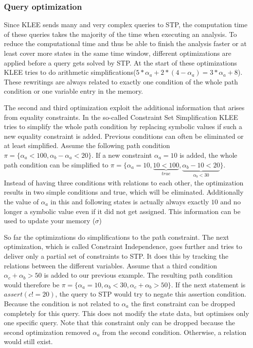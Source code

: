 \subsubsection{Query optimization}
Since KLEE sends many and very complex queries to STP, the computation time of these queries takes the majority of the time when executing an analysis. To reduce the computational time and thus be able to finish the analysis faster or at least cover more states in the same time window, different optimizations are applied before a query gets solved by STP. 
At the start of these optimizations KLEE tries to do arithmetic simplifications($5*\alpha_a + 2*(4-\alpha_a) = 3 * \alpha_a + 8$). These rewritings are always related to exactly one condition of the whole path condition or one variable entry in the memory.

The second and third optimization exploit the additional information that arises from equality constraints. In the so-called Constraint Set Simplification KLEE tries to simplify the whole path condition by replacing symbolic values if such a new equality constraint is added. Previous conditions can often be eliminated or at least simplified. 
Assume the following path condition $\pi = \{\alpha_a < 100, \alpha_b - \alpha_a< 20\}$. If a new constraint $\alpha_a = 10$ is added, the whole path condition can be simplified to $\pi = \{\alpha_a = 10, \underbrace{10 < 100}_{true},\underbrace{\alpha_b - 10 < 20}_{\alpha_b < 30}\}$. Instead of having three conditions with relations to each other, the optimization results in two simple conditions and true, which will be eliminated. Additionally the value of $\alpha_a$ in this and following states is actually always exactly $10$ and no longer a symbolic value even if it did not get assigned. This information can be used to update your memory ($\sigma$)

So far the optimizations do simplifications to the path constraint. The next optimization, which is called Constraint Independence, goes further and tries to deliver only a partial set of constraints to STP. It does this by tracking the relations between the different variables. Assume that a third condition $\alpha_c + \alpha_b > 50$ is added to our previous example. The resulting path condition would therefore be $\pi = \{\alpha_a = 10, \alpha_b < 30, \alpha_c + \alpha_b > 50\}$. If the next statement is $assert(c != 20)$, the query to STP would try to negate this assertion condition. Because the condition is not related to $\alpha_a$ the first constraint can be dropped completely for this query. This does not modify the state data, but optimises only one specific query. Note that this constraint only can be dropped because the second optimization removed $\alpha_a$ from the second condition. Otherwise, a relation would still exist.

